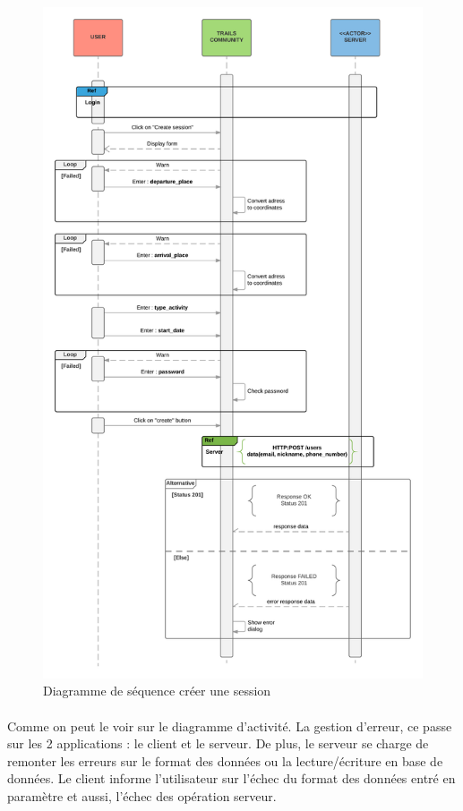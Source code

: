 \documentclass[titlepage, 12pt]{report}
\begin{document}
\begin{figure}[!h]
\caption{Diagramme de séquence créer une session}
\label{create_session_sequence_diagram}
\centering
\includegraphics[scale=0.5]{Images/diagram/create_session_sequence_diagram.png}
\end{figure}

\paragraph{}Comme on peut le voir sur le diagramme d'activité. La gestion d'erreur, ce passe sur les 2 applications : le client et le serveur. De plus, le serveur se charge de remonter les erreurs sur le format des données ou la lecture/écriture en base de données. Le client informe l'utilisateur sur l'échec du format des données entré en paramètre et aussi, l'échec des opération serveur.
\end{document}
